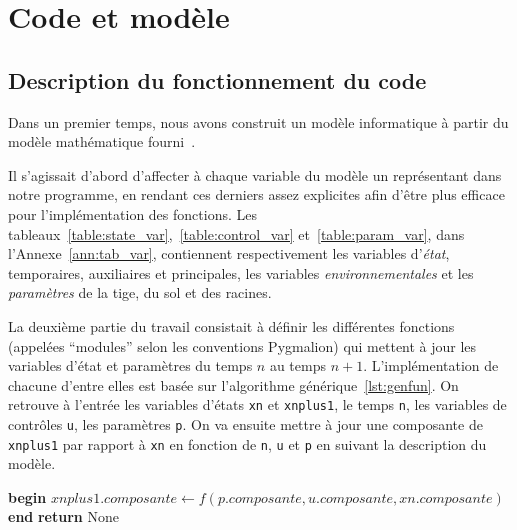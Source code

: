\section{Code et modèle}

\newpage
\subsection{Description du fonctionnement du code}
Dans un premier temps, nous avons construit un modèle informatique à partir
du modèle mathématique fourni~\cite{lnas_model_wheat}.

Il s'agissait d'abord d'affecter à chaque variable du modèle un représentant
dans notre programme, en rendant ces derniers assez explicites
afin d'être plus efficace pour l'implémentation des fonctions.
Les tableaux~\ref{table:state_var},~\ref{table:control_var} et~\ref{table:param_var}, dans l'Annexe~\ref{ann:tab_var},
contiennent respectivement les variables d'\emph{état}, temporaires, auxiliaires et principales, 
les variables \emph{environnementales} et les \emph{paramètres} de la tige, du sol et des racines.

La deuxième partie du travail consistait à définir les différentes fonctions (appelées ``modules'' selon les conventions Pygmalion)
qui mettent à jour les variables d'état et paramètres du 
temps $n$ au temps $n+1$.
L'implémentation de chacune d'entre elles est basée sur l'algorithme générique~\ref{lst:genfun}.
On retrouve à l'entrée les variables d'états \texttt{xn} et \texttt{xnplus1},
le temps \texttt{n}, les variables de contrôles \texttt{u}, les paramètres \texttt{p}.
On va ensuite mettre à jour une composante de \lstinline|xnplus1| par rapport à \texttt{xn} en fonction de \texttt{n}, \texttt{u} et \texttt{p} en suivant la description du modèle.

\begin{algorithm}[h]
  \caption{Algorithme générique qui sert de base pour l'implémentation
des fonctions. La fonction $f$ n'est pas définie mais sert de placeholder
pour représenter les opérations nécessaires à la mise à jour de \lstinline|xnplus1|.}
\label{lst:genfun}
  \begin{algorithmic}[1]
    \State \textbf{begin}
      \State $xnplus1.composante \gets f(p.composante, u.composante, xn.composante)$
    \State \textbf{end}
    \State \textbf{return} None
    \EndProcedure
  \end{algorithmic}
\end{algorithm}

